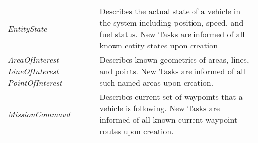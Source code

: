 \begin{longtable}[c]{@{}ll@{}}
\begin{minipage}[t]{0.29\columnwidth}
\emph{EntityState}
\strut\end{minipage} &
\begin{minipage}[t]{0.65\columnwidth}\raggedright\strut
Describes the actual state of a vehicle in the system including
position, speed, and fuel status. New Tasks are informed of all known
entity states upon creation.
\strut\end{minipage}\tabularnewline
\begin{minipage}[t]{0.29\columnwidth}\raggedright\strut
\emph{AreaOfInterest} \emph{LineOfInterest} \emph{PointOfInterest}
\strut\end{minipage} &
\begin{minipage}[t]{0.65\columnwidth}\raggedright\strut
Describes known geometries of areas, lines, and points. New Tasks are
informed of all such named areas upon creation.
\strut\end{minipage}\tabularnewline
\begin{minipage}[t]{0.29\columnwidth}\raggedright\strut
\emph{MissionCommand}
\strut\end{minipage} &
\begin{minipage}[t]{0.65\columnwidth}\raggedright\strut
Describes current set of waypoints that a vehicle is following. New
Tasks are informed of all known current waypoint routes upon creation.
\strut\end{minipage}\tabularnewline
\bottomrule
\end{longtable}

